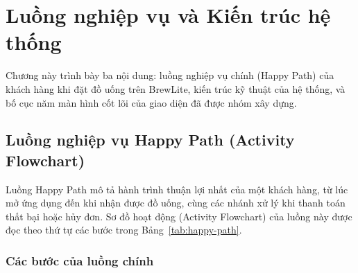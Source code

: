 
\section{Luồng nghiệp vụ và Kiến trúc hệ thống}
\label{sec:chuong-luong-nghiep-vu-kien-truc}

Chương này trình bày ba nội dung: luồng nghiệp vụ chính (Happy Path) của khách hàng khi đặt đồ uống trên BrewLite, kiến trúc kỹ thuật của hệ thống, và bố cục năm màn hình cốt lõi của giao diện đã được nhóm xây dựng.

\subsection{Luồng nghiệp vụ Happy Path (Activity Flowchart)}
\label{sec:happy-path}

Luồng Happy Path mô tả hành trình thuận lợi nhất của một khách hàng, từ lúc mở ứng dụng đến khi nhận được đồ uống, cùng các nhánh xử lý khi thanh toán thất bại hoặc hủy đơn. Sơ đồ hoạt động (Activity Flowchart) của luồng này được đọc theo thứ tự các bước trong Bảng~\ref{tab:happy-path}.

\subsubsection{Các bước của luồng chính}

